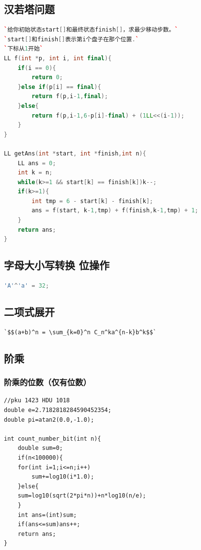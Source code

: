 \documentclass[a4paper]{article}
\begin{document}
\begin{CJK*}{UTF8}{gbsn}
\begin{multicols}{3}
\begin{flushleft}
\begin{lstlisting}
\end{lstlisting}

\subsection{汉若塔问题}
\begin{lstlisting}[language={c++}]
`给你初始状态start[]和最终状态finish[]，求最少移动步数。`
`start[]和finish[]表示第i个盘子在那个位置.`
`下标从1开始`
LL f(int *p, int i, int final){
    if(i == 0){
        return 0;
    }else if(p[i] == final){
        return f(p,i-1,final);
    }else{
        return f(p,i-1,6-p[i]-final) + (1LL<<(i-1));
    }
}

LL getAns(int *start, int *finish,int n){
    LL ans = 0;
    int k = n;
    while(k>=1 && start[k] == finish[k])k--;
    if(k>=1){
        int tmp = 6 - start[k] - finish[k];
        ans = f(start, k-1,tmp) + f(finish,k-1,tmp) + 1;
    }
    return ans;
}

\end{lstlisting}


\subsection{字母大小写转换 位操作}
\begin{lstlisting}[language={c++}]
'A'^'a' = 32; 
\end{lstlisting}


\subsection{二项式展开}
\begin{lstlisting}
`$$(a+b)^n = \sum_{k=0}^n C_n^ka^{n-k}b^k$$`
\end{lstlisting}


\subsection{阶乘}

\subsubsection{阶乘的位数（仅有位数）}
\begin{lstlisting}
//pku 1423 HDU 1018
double e=2.7182818284590452354;
double pi=atan2(0.0,-1.0);

int count_number_bit(int n){
	double sum=0;
	if(n<100000){
	for(int i=1;i<=n;i++)
		sum+=log10(i*1.0);
	}else{
	sum=log10(sqrt(2*pi*n))+n*log10(n/e);
	}
	int ans=(int)sum;
	if(ans<=sum)ans++;
	return ans;
} 
\end{lstlisting}



\end{flushleft}
\end{multicols}
\end{CJK*}
\end{document}
